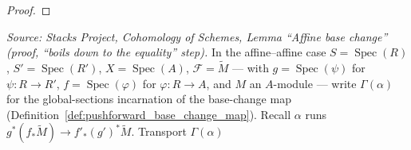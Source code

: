\begin{proof}
\end{proof}

\begin{lemma}


  \label{lem:pushforward_base_change_mate_cancelBaseChange}
  \textit{Source: Stacks Project, Cohomology of Schemes, Lemma ``Affine base
  change'' (proof, ``boils down to the equality'' step).}
  In the affine--affine case \(S = \operatorname{Spec}(R)\),
  \(S' = \operatorname{Spec}(R')\), \(X = \operatorname{Spec}(A)\),
  \(\mathcal{F} = \widetilde{M}\) — with \(g = \operatorname{Spec}(\psi)\) for
  \(\psi : R \to R'\), \(f = \operatorname{Spec}(\varphi)\) for \(\varphi : R \to A\),
  and \(M\) an \(A\)-module — write \(\Gamma(\alpha)\) for the global-sections
  incarnation of the base-change map (Definition~\ref{def:pushforward_base_change_map}).
  Recall \(\alpha\) runs
  \(g^*(f_*\widetilde{M}) \to f'_*(g')^*\widetilde{M}\). Transport \(\Gamma(\alpha)\)

\end{lemma}

